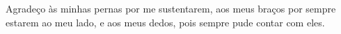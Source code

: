 \begin{agradecimentos}
    Agradeço às minhas pernas por me sustentarem, aos meus braços por sempre estarem ao meu lado, e aos meus dedos, pois sempre pude contar com eles.
\end{agradecimentos}